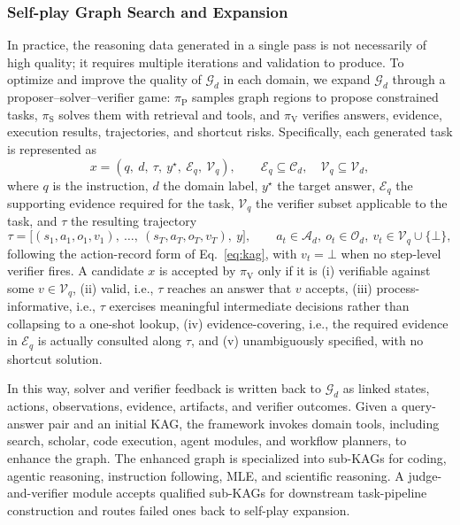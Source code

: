 \subsubsection{Self-play Graph Search and Expansion}
\label{sec:game-generation}

In practice, the reasoning data generated in a single pass is not necessarily of high quality; it requires multiple iterations and validation to produce.
To optimize and improve the quality of $\mathcal{G}_d$ in each domain, we expand $\mathcal{G}_d$ through a proposer--solver--verifier game: $\pi_{\text{P}}$ samples graph regions to propose constrained tasks, $\pi_{\text{S}}$ solves them with retrieval and tools, and $\pi_{\text{V}}$ verifies answers, evidence, execution results, trajectories, and shortcut risks. Specifically, each generated task is represented as
\begin{equation}
x = (q,\ d,\ \tau,\ y^\star,\ \mathcal{E}_q,\ \mathcal{V}_q),
\qquad
\mathcal{E}_q \subseteq \mathcal{C}_d,\quad \mathcal{V}_q \subseteq \mathcal{V}_d,
\label{eq:task}
\end{equation}
where $q$ is the instruction, $d$ the domain label, $y^\star$ the target answer, $\mathcal{E}_q$ the supporting evidence required for the task, $\mathcal{V}_q$ the verifier subset applicable to the task, and $\tau$ the resulting trajectory
\begin{equation}
\tau = \big[(s_1, a_1, o_1, v_1),\ \ldots,\ (s_T, a_T, o_T, v_T),\ y\big],
\qquad
a_t \in \mathcal{A}_d,\ o_t \in \mathcal{O}_d,\ v_t \in \mathcal{V}_q \cup \{\bot\},
\label{eq:trajectory}
\end{equation}
following the action-record form of Eq.~\ref{eq:kag}, with $v_t = \bot$ when no step-level verifier fires.
A candidate $x$ is accepted by $\pi_{\text{V}}$ only if it is (i) verifiable against some $v \in \mathcal{V}_q$, (ii) valid, i.e., $\tau$ reaches an answer that $v$ accepts, (iii) process-informative, i.e., $\tau$ exercises meaningful intermediate decisions rather than collapsing to a one-shot lookup, (iv) evidence-covering, i.e., the required evidence in $\mathcal{E}_q$ is actually consulted along $\tau$, and (v) unambiguously specified, with no shortcut solution.

In this way, solver and verifier feedback is written back to $\mathcal{G}_d$ as linked states, actions, observations, evidence, artifacts, and verifier outcomes. Given a query-answer pair and an initial KAG, the framework invokes domain tools, including search, scholar, code execution, agent modules, and workflow planners, to enhance the graph. The enhanced graph is specialized into sub-KAGs for coding, agentic reasoning, instruction following, MLE, and scientific reasoning. A judge-and-verifier module accepts qualified sub-KAGs for downstream task-pipeline construction and routes failed ones back to self-play expansion.

